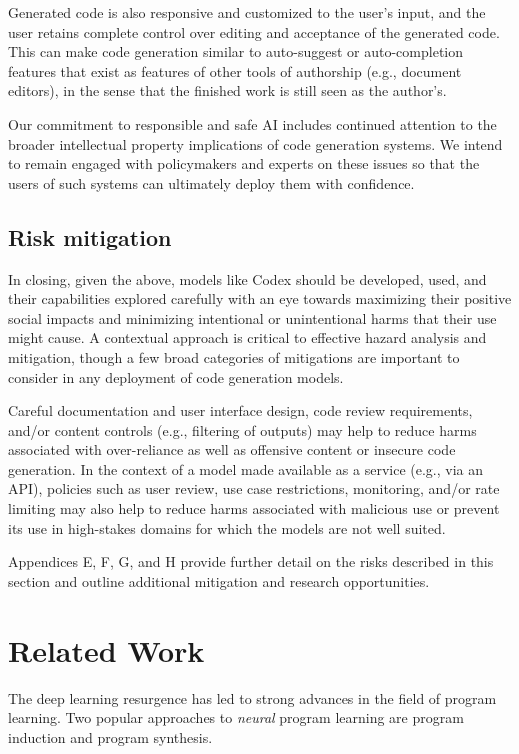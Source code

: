 Generated code is also responsive and customized to the user's input, and the user retains complete control over editing and acceptance of the generated code. This can make code generation similar to auto-suggest or auto-completion features that exist as features of other tools of authorship (e.g., document editors), in the sense that the finished work is still seen as the author's.

Our commitment to responsible and safe AI includes continued attention to the broader intellectual property implications of code generation systems. We intend to remain engaged with policymakers and experts on these issues so that the users of such systems can ultimately deploy them with confidence.

\subsection{Risk mitigation}
\label{sec:impacts:mitigation}
In closing, given the above, models like Codex should be developed, used, and their capabilities explored carefully with an eye towards maximizing their positive social impacts and minimizing intentional or unintentional harms that their use might cause. A contextual approach is critical to effective hazard analysis and mitigation, though a few broad categories of mitigations are important to consider in any deployment of code generation models. 

Careful documentation and user interface design, code review requirements, and/or content controls (e.g., filtering of outputs) may help to reduce harms associated with over-reliance as well as offensive content or insecure code generation. In the context of a model made available as a service (e.g., via an API), policies such as user review, use case restrictions, monitoring, and/or rate limiting may also help to reduce harms associated with malicious use or prevent its use in high-stakes domains for which the models are not well suited. 

Appendices E, F, G, and H provide further detail on the risks described in this section and outline additional mitigation and research opportunities. 

\section{Related Work}
\label{sec:related}

The deep learning resurgence has led to strong advances in the field of program learning. Two popular approaches to \textit{neural} program learning are program induction and program synthesis.

